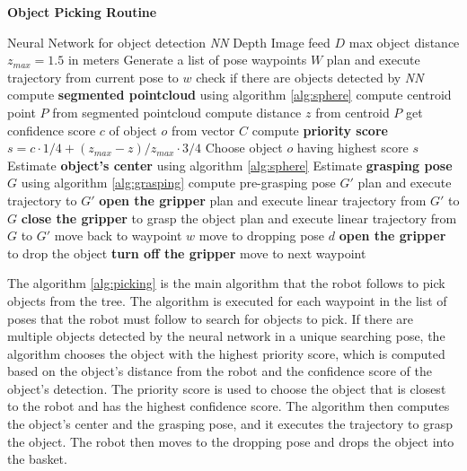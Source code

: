 \begin{algorithm}[hp]
    \caption{\textbf{Object Picking Routine}}
    \label{alg:picking}
    \begin{algorithmic}[1]
        \Require Neural Network for object detection \textit{NN}
        \Require Depth Image feed $D$
        \State max object distance $z_{max} = 1.5$ in meters
        \State Generate a list of pose waypoints $W$
            \State plan and execute trajectory from current pose to $w$
            \State check if there are objects detected by \textit{NN}
                \State compute \textbf{segmented pointcloud} using algorithm \ref{alg:sphere}
                \State compute centroid point $P$ from segmented pointcloud
                \State compute distance $z$ from centroid $P$
                \State get confidence score $c$ of object $o$ from vector $C$
                \State compute \textbf{priority score} $s = c \cdot 1/4 + (z_{max} - z)/z_{max} \cdot 3/4$
            \EndFor
            \State Choose object $o$ having highest score $s$
        \EndFor
        \State Estimate \textbf{object's center} using algorithm \ref{alg:sphere}
        \State Estimate \textbf{grasping pose} $G$ using algorithm \ref{alg:grasping}
            \State compute pre-grasping pose $G'$
            \State plan and execute trajectory to $G'$
            \State \textbf{open the gripper}
            \State plan and execute linear trajectory from $G'$ to $G$
            \State \textbf{close the gripper} to grasp the object
            \State plan and execute linear trajectory from $G$ to $G'$
            \State move back to waypoint $w$
            \State move to dropping pose $d$
            \State \textbf{open the gripper} to drop the object
            \State \textbf{turn off the gripper}
        \Else
            \State move to next waypoint
        \EndIf
    \end{algorithmic}
\end{algorithm}

The algorithm \ref{alg:picking} is the main algorithm that the robot follows to pick objects from the tree.
The algorithm is executed for each waypoint in the list of poses that the robot must follow to search
for objects to pick. If there are multiple objects detected by the neural network in a unique searching pose,
the algorithm chooses the object with the highest priority score, which is computed based on the object's distance
from the robot and the confidence score of the object's detection. The priority score is used to choose the object
that is closest to the robot and has the highest confidence score. The algorithm then computes the object's center
and the grasping pose, and it executes the trajectory to grasp the object. The robot then moves to the dropping pose
and drops the object into the basket. 


